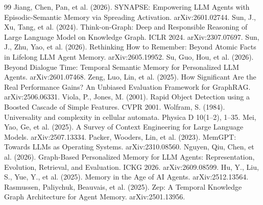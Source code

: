 \documentclass[11pt]{article}
\begin{document}
\begin{thebibliography}{99}
 Jiang, Chen, Pan, et al. (2026). SYNAPSE: Empowering LLM Agents with Episodic-Semantic Memory via Spreading Activation. arXiv:2601.02744.
 Sun, J., Xu, Tang, et al. (2024). Think-on-Graph: Deep and Responsible Reasoning of Large Language Model on Knowledge Graph. ICLR 2024. arXiv:2307.07697.
 Sun, J., Zhu, Yao, et al. (2026). Rethinking How to Remember: Beyond Atomic Facts in Lifelong LLM Agent Memory. arXiv:2605.19952.
 Su, Guo, Hou, et al. (2026). Beyond Dialogue Time: Temporal Semantic Memory for Personalized LLM Agents. arXiv:2601.07468.
 Zeng, Luo, Lin, et al. (2025). How Significant Are the Real Performance Gains? An Unbiased Evaluation Framework for GraphRAG. arXiv:2506.06331.
 Viola, P., Jones, M. (2001). Rapid Object Detection using a Boosted Cascade of Simple Features. CVPR 2001.
 Wolfram, S. (1984). Universality and complexity in cellular automata. Physica D 10(1--2), 1--35.
 Mei, Yao, Ge, et al. (2025). A Survey of Context Engineering for Large Language Models. arXiv:2507.13334.
 Packer, Wooders, Lin, et al. (2023). MemGPT: Towards LLMs as Operating Systems. arXiv:2310.08560.
 Nguyen, Qiu, Chen, et al. (2026). Graph-Based Personalized Memory for LLM Agents: Representation, Evolution, Retrieval, and Evaluation. ICKG 2026. arXiv:2609.08599.
 Hu, Y., Liu, S., Yue, Y., et al. (2025). Memory in the Age of AI Agents. arXiv:2512.13564.
 Rasmussen, Paliychuk, Beauvais, et al. (2025). Zep: A Temporal Knowledge Graph Architecture for Agent Memory. arXiv:2501.13956.
\end{thebibliography}
\end{document}
